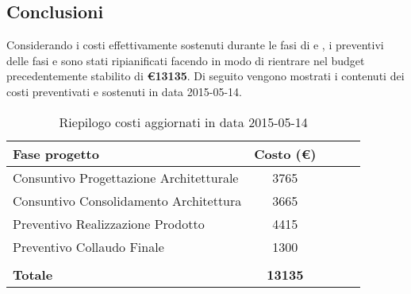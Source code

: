 \subsection{Conclusioni}
Considerando i costi effettivamente sostenuti durante le fasi di \fPA e \fPD, i preventivi delle fasi \fC e \fVV sono stati ripianificati facendo in modo di rientrare nel budget precedentemente stabilito di \textbf{\euro13135}.
Di seguito vengono mostrati i contenuti dei costi preventivati e sostenuti in data 2015-05-14.
\begin{table}[h]
\begin{center}
\begin{tabular}{|l|c|c|c|c|}
\hline Fase progetto & Costo (\euro) \\
\hline
Consuntivo Progettazione Architetturale & 3765 \\
Consuntivo Consolidamento Architettura& 3665 \\
Preventivo Realizzazione Prodotto & 4415 \\
Preventivo Collaudo Finale & 1300\\
& \\
\textbf{Totale} & \textbf{13135}\\
\hline
\end{tabular}
\caption{Riepilogo costi aggiornati in data 2015-05-14}
\end{center}
\end{table}
\FloatBarrier
